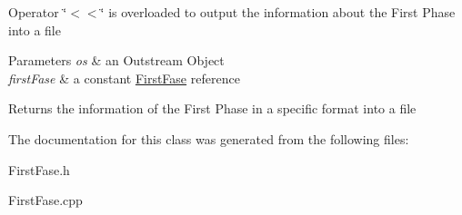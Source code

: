 Operator \char`\"{}$<$$<$\char`\"{} is overloaded to output the information about the First Phase into a file 
\begin{DoxyParams}{Parameters}
{\em os} & an Outstream Object \\
\hline
{\em first\+Fase} & a constant \hyperlink{class_first_fase}{First\+Fase} reference \\
\hline
\end{DoxyParams}
\begin{DoxyReturn}{Returns}
the information of the First Phase in a specific format into a file 
\end{DoxyReturn}


The documentation for this class was generated from the following files\+:\begin{DoxyCompactItemize}
\item 
First\+Fase.\+h\item 
First\+Fase.\+cpp\end{DoxyCompactItemize}
